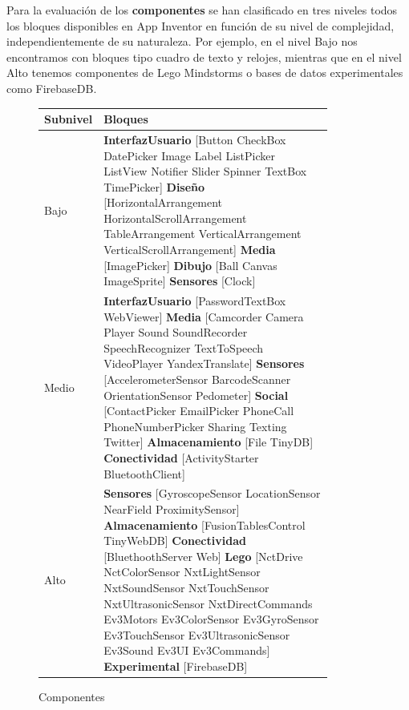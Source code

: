 \documentclass[a4paper, 12pt]{book}
\begin{document}
Para la evaluación de los \textbf{componentes} se han clasificado en tres niveles todos los bloques disponibles en App Inventor en función de su nivel de complejidad, independientemente de su naturaleza. Por ejemplo, en el nivel Bajo nos encontramos con bloques tipo cuadro de texto y relojes, mientras que en el nivel Alto tenemos componentes de Lego Mindstorms o bases de datos experimentales como FirebaseDB. 

\begin{figure}
	\begin{center}
	    \begin{tabular}{| l | p{0.85\linewidth} | }
	    \hline
	    \textbf{Subnivel} & \textbf{Bloques} \\ \hline
		Bajo & \textbf{InterfazUsuario} [Button CheckBox DatePicker Image Label ListPicker ListView Notifier Slider Spinner TextBox TimePicker] \textbf{Diseño} [HorizontalArrangement HorizontalScrollArrangement TableArrangement VerticalArrangement VerticalScrollArrangement] \textbf{Media} [ImagePicker] \textbf{Dibujo} [Ball Canvas ImageSprite] \textbf{Sensores} [Clock] \\ \hline
		Medio & \textbf{InterfazUsuario} [PasswordTextBox WebViewer] \textbf{Media} [Camcorder Camera Player Sound SoundRecorder SpeechRecognizer TextToSpeech VideoPlayer YandexTranslate] \textbf{Sensores} [AccelerometerSensor BarcodeScanner OrientationSensor Pedometer] \textbf{Social} [ContactPicker EmailPicker PhoneCall PhoneNumberPicker Sharing Texting Twitter] \textbf{Almacenamiento} [File TinyDB] \textbf{Conectividad} [ActivityStarter BluetoothClient]\\ \hline
		Alto & \textbf{Sensores} [GyroscopeSensor LocationSensor NearField ProximitySensor] \textbf{Almacenamiento} [FusionTablesControl TinyWebDB] \textbf{Conectividad} [BluethoothServer Web] \textbf{Lego} [NctDrive NctColorSensor NxtLightSensor NxtSoundSensor NxtTouchSensor NxtUltrasonicSensor NxtDirectCommands Ev3Motors Ev3ColorSensor Ev3GyroSensor Ev3TouchSensor Ev3UltrasonicSensor Ev3Sound Ev3UI Ev3Commands] \textbf{Experimental} [FirebaseDB]\\ \hline
            \end{tabular}
	\end{center}
	\caption{Componentes}
	\label{fig:componentsScore}
\end{figure}
\end{document}
